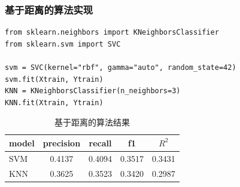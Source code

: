 \begin{frame}[fragile]
    \frametitle{基于距离的算法实现}
    \begin{verbatim}
from sklearn.neighbors import KNeighborsClassifier
from sklearn.svm import SVC

svm = SVC(kernel="rbf", gamma="auto", random_state=42)
svm.fit(Xtrain, Ytrain)
KNN = KNeighborsClassifier(n_neighbors=3)
KNN.fit(Xtrain, Ytrain)
    \end{verbatim}
    \begin{table}
        \caption{基于距离的算法结果}
        \begin{tabular}{l|cccc}
            model & precision & recall & f1     & \(R^2\) \\ \hline
            SVM   & 0.4137    & 0.4094 & 0.3517 & 0.3431  \\
            KNN   & 0.3625    & 0.3523 & 0.3420 & 0.2987  \\
        \end{tabular}
        \label{distances}
    \end{table}
\end{frame}
